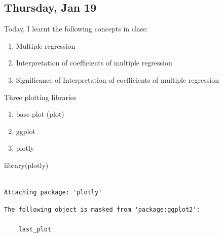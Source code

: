 \documentclass[
  letterpaper,
  DIV=11,
  numbers=noendperiod]{scrartcl}
\newenvironment{Shaded}{\begin{snugshade}}{\end{snugshade}}
\newcommand{\FunctionTok}[1]{\textcolor[rgb]{0.28,0.35,0.67}{#1}}
\newcommand{\NormalTok}[1]{\textcolor[rgb]{0.00,0.23,0.31}{#1}}
\providecommand{\tightlist}{%
  \setlength{\itemsep}{0pt}\setlength{\parskip}{0pt}}\usepackage{longtable,booktabs,array}
\begin{document}
\hypertarget{thursday-jan-19}{%
\subsection{Thursday, Jan 19}\label{thursday-jan-19}}

\begin{tcolorbox}[enhanced jigsaw, bottomrule=.15mm, coltitle=black, breakable, opacityback=0, rightrule=.15mm, colframe=quarto-callout-important-color-frame, toptitle=1mm, leftrule=.75mm, opacitybacktitle=0.6, bottomtitle=1mm, titlerule=0mm, title=\textcolor{quarto-callout-important-color}{\faExclamation}\hspace{0.5em}{TIL}, arc=.35mm, toprule=.15mm, colbacktitle=quarto-callout-important-color!10!white, colback=white, left=2mm]

Today, I learnt the following concepts in class:

\begin{enumerate}
\def\labelenumi{\arabic{enumi}.}
\tightlist
\item
  Multiple regression
\item
  Interpretation of coefficients of multiple regression
\item
  Significance of Interpretation of coefficients of multiple regression
\end{enumerate}

\end{tcolorbox}

Three plotting libraries

\begin{enumerate}
\def\labelenumi{\arabic{enumi}.}
\tightlist
\item
  base plot (plot)
\item
  ggplot
\item
  plotly
\end{enumerate}

\begin{Shaded}
\begin{Highlighting}[]
\FunctionTok{library}\NormalTok{(plotly)}
\end{Highlighting}
\end{Shaded}

\begin{verbatim}

Attaching package: 'plotly'
\end{verbatim}

\begin{verbatim}
The following object is masked from 'package:ggplot2':

    last_plot
\end{verbatim}
\end{document}
